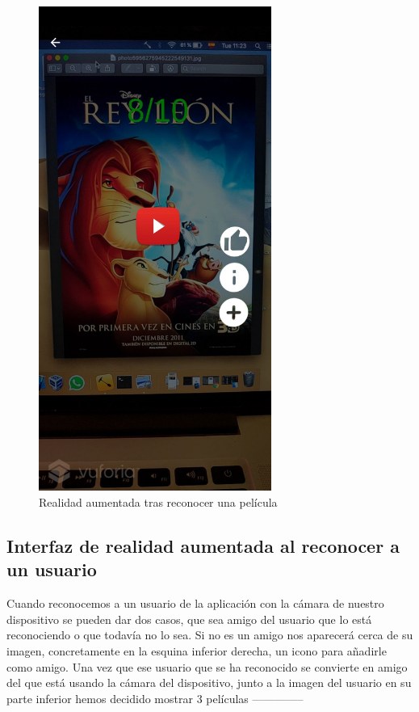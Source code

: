\begin{figure}[H]
    \centering
    \includegraphics[width=3in]{figures/filmrecognized2.jpg}
    \caption{Realidad aumentada tras reconocer una película}
\end{figure}

\newpage
\subsection{Interfaz de realidad aumentada al reconocer a un usuario}
\label{makereference3.4.5}

Cuando reconocemos a un usuario de la aplicación con la cámara de nuestro dispositivo se pueden dar dos casos, que sea amigo del usuario que lo está reconociendo o que todavía no lo sea.
Si no es un amigo nos aparecerá cerca de su imagen, concretamente en la esquina inferior derecha, un icono para añadirle como amigo. Una vez que ese usuario que se ha reconocido se convierte
en amigo del que está usando la cámara del dispositivo, junto a la imagen del usuario en su parte inferior hemos decidido mostrar 3 películas --------------

